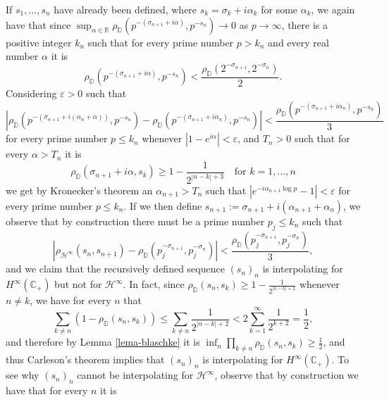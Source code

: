 \documentclass[preprint,12pt,number]{elsarticle}
\newcommand{\R}{\mathbb{R}}
\newcommand{\C}{\mathbb{C}}
\newcommand{\D}{\mathbb{D}}
\begin{document}
If $s_1,\dots,s_n$ have already been defined, where $s_k=\sigma_k+i\alpha_k$ for some $\alpha_k$, we again have that since $\sup_{\alpha\in \R}\rho_\D(p^{-(\sigma_{n+1}+i\alpha)},p^{-s_n})\to 0$ as $p\to\infty$, there is a positive integer $k_n$ such that for every prime number $p>k_n$ and every real number $\alpha$ it is 
\[
\rho_\D(p^{-(\sigma_{n+1}+i\alpha)},p^{-s_n})<\frac{\rho_\D(2^{-\sigma_{n+1}},2^{-\sigma_n})}{2}.
\] 
Considering $\varepsilon>0$ such that 
\[
|\rho_\D(p^{-(\sigma_{n+1}+i(\alpha_n+\alpha))},p^{-s_n})-\rho_\D(p^{-(\sigma_{n+1}+i\alpha_n)},p^{-s_n})|<\frac{\rho_\D(p^{-(\sigma_{n+1}+i\alpha_n)},p^{-s_n})}{3}
\] 
for every prime number $p\leq k_n$ whenever $|1-e^{i\alpha}|<\varepsilon$, and $T_n>0$ such that for every $\alpha>T_n$ it is 
\[
\rho_\D(\sigma_{n+1}+i\alpha,s_k)\geq1-\frac{1}{2^{|n-k|+3}}\quad \text{for } k=1,\dots,n
\] 
we get by Kronecker's theorem an $\alpha_{n+1}>T_n$ such that $|e^{-i\alpha_{n+1} \log p}-1|<\varepsilon$ for every prime number $p\leq k_n$. If we then define $s_{n+1}:=\sigma_{n+1}+i(\alpha_{n+1}+\alpha_n)$, we observe that by construction there must be a prime number $p_j\leq k_n$ such that 
\[
|\rho_{\mathscr{H}^{\infty}}(s_n,s_{n+1})-\rho_\D(p_j^{-\sigma_{n+1}},p_j^{-\sigma_n})|<\frac{\rho_\D(p_j^{-\sigma_{n+1}},p_j^{-\sigma_n})}{3},
\] 
and we claim that the recursively defined sequence $(s_n)_n$ is interpolating for $H^\infty(\C_+)$ but not for $\mathscr{H}^{\infty}$. In fact, since $\rho_\D(s_n,s_k)\geq1-\frac{1}{2^{|n-k|+2}}$ whenever $n\neq k$, we have for every $n$ that 
\[
\sum_{k\neq n}(1-\rho_\D(s_n,s_k))\leq \sum_{k\neq n} \frac{1}{2^{|n-k|+2}}< 2\sum_{k=1}^\infty \frac{1}{2^{k+2}}=\frac{1}{2},
\] 
and therefore by Lemma \ref{lema-blaschke} it is  $\inf_n\prod_{k\neq n}\rho_\D(s_n,s_k)\geq \frac{1}{2}$, and thus Carleson's theorem implies that $(s_n)_n$ is interpolating for $H^\infty(\C_+)$. To see why $(s_n)_n$ cannot be interpolating for $\mathscr{H}^{\infty}$, observe that by construction we have that for every $n$ it is 
\end{document}
